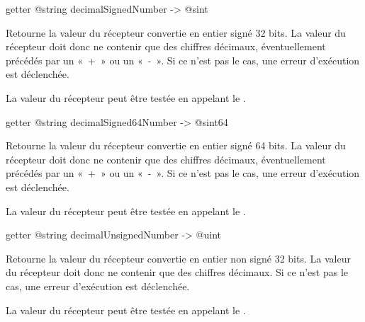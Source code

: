 
\begin{galgas3box}
getter @string decimalSignedNumber -> @sint
\end{galgas3box}

Retourne la valeur du récepteur convertie en entier signé 32 bits. La valeur du récepteur doit donc ne contenir que des chiffres décimaux, éventuellement précédés par un «~+~» ou un «~-~». Si ce n'est pas le cas, une erreur d'exécution est déclenchée.

La valeur du récepteur peut être testée en appelant le .








\begin{galgas3box}
getter @string decimalSigned64Number -> @sint64
\end{galgas3box}

Retourne la valeur du récepteur convertie en entier signé 64 bits. La valeur du récepteur doit donc ne contenir que des chiffres décimaux, éventuellement précédés par un «~+~» ou un «~-~». Si ce n'est pas le cas, une erreur d'exécution est déclenchée.

La valeur du récepteur peut être testée en appelant le .








\begin{galgas3box}
getter @string decimalUnsignedNumber -> @uint
\end{galgas3box}

Retourne la valeur du récepteur convertie en entier non signé 32 bits. La valeur du récepteur doit donc ne contenir que des chiffres décimaux. Si ce n'est pas le cas, une erreur d'exécution est déclenchée.

La valeur du récepteur peut être testée en appelant le .








